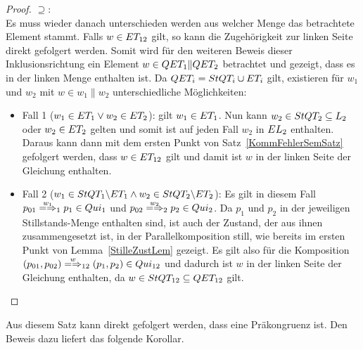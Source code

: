 \begin{proof}
  \glqq$\supseteq$\grqq{}:\\
  Es muss wieder danach unterschieden werden aus welcher Menge das betrachtete
  Element stammt. Falls $w\in ET _{12}$ gilt, so kann die Zugehörigkeit zur
  linken Seite direkt gefolgert werden. Somit wird für den weiteren Beweis
  dieser Inklusionsrichtung ein Element $w\in QET _1\|QET _2$ betrachtet und
  gezeigt, dass es in der linken Menge enthalten ist. Da $QET _i=StQT _i\cup
  ET _i$ gilt, existieren für $w_1$ und $w_2$ mit $w\in w_1\|w_2$
  unterschiedliche Möglichkeiten:
  \begin{itemize}
    \item Fall 1 ($w_1\in ET _1\lor w_2\in ET _2$): \OBdA{} gilt $w_1\in ET
      _1$. Nun kann $w_2\in StQT _2\subseteq L_2$ oder $w_2\in ET _2$ gelten
      und somit ist auf jeden Fall $w_2$ in $EL _2$ enthalten. Daraus kann
      dann mit dem ersten Punkt von Satz~\ref{KommFehlerSemSatz} gefolgert
      werden, dass $w\in ET _{12}$ gilt und damit ist $w$ in der linken Seite
      der Gleichung enthalten.
    \item Fall 2 ($w_1\in StQT _1\backslash ET _1\land w_2\in StQT _2\backslash
      ET _2$): Es gilt in diesem Fall $p_{01} \weakmay[w_1]_1 p_1\in Qui_1$
      und $p_{02} \weakmay[w_2]_2 p_2\in Qui_2$. Da $p_1$ und $p_2$ in der
      jeweiligen Stillstands-Menge enthalten sind, ist auch der Zustand, der
      aus ihnen zusammengesetzt ist, in der Parallelkomposition still, wie
      bereits im ersten Punkt von Lemma~\ref{StilleZustLem} gezeigt. Es gilt
      also für die Komposition $(p_{01},p_{02}) \weakmay[w]_{12} (p_1,p_2)\in
      Qui_{12}$ und dadurch ist $w$ in der linken Seite der Gleichung
      enthalten, da $w\in StQT _{12}\subseteq QET _{12}$ gilt.
  \end{itemize}
\end{proof}

Aus diesem Satz kann direkt gefolgert werden, dass \QRel{} eine Präkongruenz
ist. Den Beweis dazu liefert das folgende Korollar.

